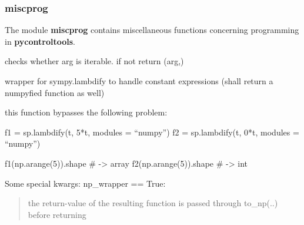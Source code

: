 \documentclass[letterpaper,10pt,english]{sphinxmanual}
\begin{document}
\subsubsection{\textbf{miscprog}}
\label{pycontroltools:miscprog}
The module \textbf{miscprog} contains miscellaneous functions concerning
programming in \textbf{pycontroltools}.
\label{pycontroltools:module-auxfuncs.programming.miscprog}\label{pycontroltools:module-miscprog}

\begin{fulllineitems}
\label{pycontroltools:auxfuncs.programming.miscprog.atoms}
\end{fulllineitems}


\begin{fulllineitems}
\label{pycontroltools:auxfuncs.programming.miscprog.aux_make_tup_if_necc}
checks whether arg is iterable.
if not return (arg,)

\end{fulllineitems}


\begin{fulllineitems}
\label{pycontroltools:auxfuncs.programming.miscprog.expr_to_func}
wrapper for sympy.lambdify to handle constant expressions
(shall return a numpyfied function as well)

this function bypasses the following problem:

f1 = sp.lambdify(t, 5*t, modules = ``numpy'')
f2 = sp.lambdify(t, 0*t, modules = ``numpy'')

f1(np.arange(5)).shape \# -\textgreater{} array
f2(np.arange(5)).shape \# -\textgreater{} int

Some special kwargs:
np\_wrapper == True:
\begin{quote}

the return-value of the resulting function is passed through
to\_np(..) before returning
\end{quote}

\end{fulllineitems}
\end{document}
